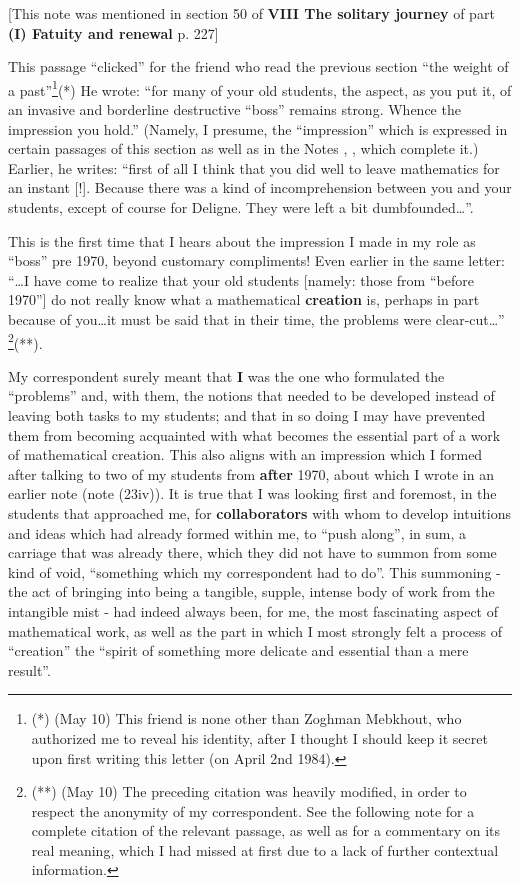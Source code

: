 [This note was mentioned in section 50 of
\textbf{VIII The solitary journey} of part \textbf{(I)
Fatuity and renewal} p. 227]

This passage ``clicked'' for the friend who read the previous section ``the weight of a
past''\footnote{(*) (May 10) This friend is none other than Zoghman Mebkhout, who
authorized me to reveal his identity, after I thought I should keep it secret upon first
writing this letter (on April 2nd 1984).}(*) He wrote: ``for many of your old students,
the aspect, as you put it, of an invasive and borderline destructive ``boss'' remains
strong. Whence the impression you hold.'' (Namely, I presume, the 
``impression'' which is expressed in certain passages of this section as well as in the
Notes
\no {}, ,  which complete it.)
Earlier, he writes: ``first of all I think that you did well to leave mathematics for an
instant [!]. Because there was a kind of incomprehension between you and your students,
except of course for Deligne. They were left a bit dumbfounded\ldots''. 

This is the first time that I hears about the impression I made in my role as ``boss''
pre 1970, beyond customary compliments!
Even earlier in the same letter: ``\ldots I have come to realize that your old students 
[namely: those from ``before 1970''] do not really know what a mathematical
\textbf{creation} is, perhaps in part because of you\ldots it must be said that in their
time, the problems were clear-cut\ldots'' \footnote{(**) (May 10) The preceding citation
was heavily modified, in order to respect the anonymity of my correspondent. See the
following note for a complete citation of the relevant passage, as well as for a
commentary on its real meaning, which I had missed at first due to a lack of further
contextual information.}(**).

My correspondent surely meant that \textbf{I} was the one who formulated the ``problems''
and, with them, the notions that needed to be developed instead of 
leaving both tasks to my students; and that in so doing I may have 
prevented them from becoming acquainted with what becomes the essential part of a work of
mathematical creation. This also aligns with an 
impression which I formed after talking
to two of my students from \textbf{after} 1970, about which I wrote in an earlier note
(note (23iv)).
It is true that I was looking first and foremost, in the students that approached me, 
for \textbf{collaborators} 
with whom to develop intuitions and ideas which had already formed within me, 
to ``push along'', in sum, a carriage that was already there, which they did not have to
summon from some kind of void, ``something which my correspondent had to do''.
This summoning - the act of bringing into being a tangible, supple, 
intense body of work from the intangible mist - had indeed always been, for me, the most
fascinating aspect of mathematical work, as well as the part in which I most strongly felt
a process of ``creation'' the ``spirit
of something more delicate and essential than a mere result''.

